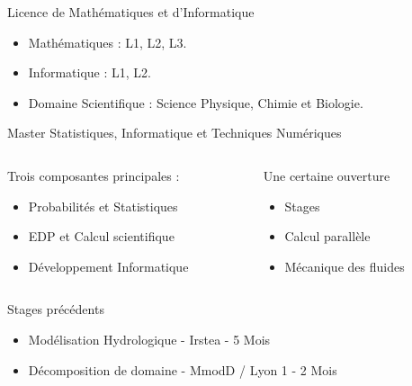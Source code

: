 \documentclass{beamer}
\begin{document}
\begin{frame}
   {
     \begin{block}{Licence de Mathématiques et d'Informatique}
      \begin{itemize}
        \item Mathématiques : L1, L2, L3.
        \item Informatique : L1, L2.
        \item Domaine Scientifique : Science Physique, Chimie et Biologie.
      \end{itemize}
    \end{block}
  }
  {
    \begin{block}{Master Statistiques, Informatique et Techniques Numériques}
      \begin{columns}[t]

        \begin{column}{5.5cm}
          Trois composantes principales :
          \begin{itemize}
            \item Probabilités et Statistiques
            \item EDP et Calcul scientifique
            \item Développement Informatique
          \end{itemize}
        \end{column}

        \begin{column}{4.5cm}
          Une certaine ouverture  
          \begin{itemize}
            \item \alert{Stages}
            \item Calcul parallèle
            \item Mécanique des fluides
          \end{itemize}
        \end{column}
      \end{columns}  
    \end{block}
  }
  {
    \begin{block}{Stages précédents}
      \begin{itemize}
        \item Modélisation Hydrologique - Irstea - 5 Mois
        \item Décomposition de domaine - MmodD / Lyon 1 - 2 Mois
      \end{itemize}
    \end{block}
  }
\end{frame}
\end{document}
